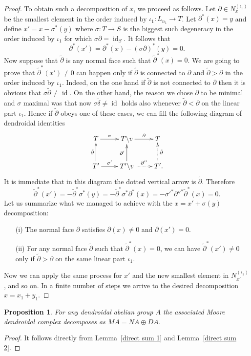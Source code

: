 \documentclass[a4paper]{amsart}
\theoremstyle{plain}
\newtheorem{prop}[thm]{Proposition}
\theoremstyle{definition}
\theoremstyle{remark}
\DeclareMathOperator{\id}{id}
\newcommand{\To}{\longrightarrow}
\numberwithin{equation}{section}
\numberwithin{figure}{section}
\begin{document}
\begin{proof}
To obtain such a decomposition of $x$, we proceed as follows. Let $\partial\in N_x^{(\iota_1)}$
be the smallest element in the order induced by $\iota_1\colon L_{n_1}\To T$. Let $\partial^*(x)=y$ and define $x'=x-\sigma^*(y)$ where $\sigma\colon T\to S$ is the
biggest such degeneracy in the order induced by $\iota_1$ for which $\sigma\partial=\id_{S}$.
It follows that
\[
\partial^*(x')=\partial^*(x)-(\sigma\partial)^*(y)=0.
\]
Now suppose that $\tilde\partial$ is any normal face such that $\tilde\partial^*(x)=0$. We are going to prove that $\tilde\partial^*(x')\neq 0$ can happen only if $\tilde\partial$ is connected to $\partial$ and $\tilde\partial> \partial$ in the order induced by $\iota_1$.
Indeed, on the one hand if $\tilde\partial$ is not connected to $\partial$ then it is obvious that $\sigma\tilde\partial\ne\id$. On the other hand, the reason we chose $\partial$ to be minimal and $\sigma$ maximal was that now $\sigma\tilde\delta\ne\id$ holds also whenever $\tilde\partial<\partial$ on the linear part $\iota_1$. Hence if $\tilde\partial$ obeys one of these cases, we can fill the following diagram of dendroidal identities
\[
\xymatrix{T\ar[r]^-{\sigma} &T\backslash v\ar[r]^-{\partial} &T\\
T'\ar[u]^-{\tilde\partial}\ar[r]^-{\sigma'} &T'\backslash
v\ar[u]^-{\partial'}\ar@{.>}[r]^-{\partial''} &T'{\rlap .}\ar@{.>}[u]_-{\tilde\partial}}
\]
It is immediate that in this diagram the dotted vertical arrow is $\tilde\partial$. Therefore
\[
\tilde\partial^*(x')=-\tilde\partial^*\sigma^*(y)=-\tilde\partial^*\sigma^*\partial^*(x)=-\sigma'^*\partial''^*
\tilde\partial^*(x)=0.
\]
Let us summarize what we managed to achieve with the $x=x'+\sigma(y)$ decomposition:
\begin{itemize}
\item[{\rm (i)}] The normal face $\partial$ satisfies $\partial(x)\ne 0$ and $\partial(x')=0$.
\item[{\rm (ii)}] For any normal face $\tilde\partial$ such that $\tilde\partial^*(x)=0$, we can have $\tilde\partial^*(x')\neq 0$ only if $\tilde\partial> \partial$ on the same linear part $\iota_1$.
\end{itemize}
Now we can apply the same process for $x'$ and the new smallest element in $N_{x'}^{(\iota_1)}$, and so on. In a finite number of steps we arrive to the desired decomposition $x=x_1+y_1$.
\end{proof}

\begin{prop}\label{direct sum}
For any dendroidal abelian group $A$ the associated Moore dendroidal complex decomposes as $MA=NA\oplus DA$.
\end{prop}
\begin{proof}
It follows directly from Lemma~\ref{direct sum 1} and Lemma~\ref{direct sum 2}.
\end{proof}
\end{document}
